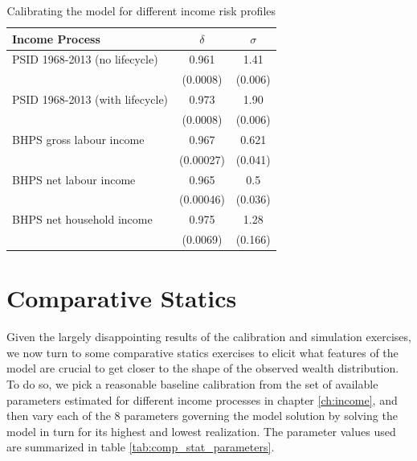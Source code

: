 \begin{table}%
\begin{tabular}{|l|c|c|}
\hline
       Income Process            & $\delta$ & $\sigma$ \\
\hline                          
PSID 1968-2013 (no lifecycle)    &  0.961 & 1.41    \\
                  & \footnotesize{(0.0008)} & \footnotesize{(0.006)} \\ 
PSID 1968-2013 (with lifecycle)  &  0.973 & 1.90    \\
                  & \footnotesize{(0.0008)} & \footnotesize{(0.006)} \\
BHPS gross labour income         &  0.967 & 0.621    \\
                  & \footnotesize{(0.00027)} & \footnotesize{(0.041)} \\
BHPS net labour income           &  0.965 & 0.5    \\
                  & \footnotesize{(0.00046)} & \footnotesize{(0.036)} \\
BHPS net household income        &  0.975 & 1.28     \\
                  & \footnotesize{(0.0069)} & \footnotesize{(0.166)} \\
\hline
\end{tabular}
\caption{Calibrating the model for different income risk profiles}
\label{tab:calibration_results}
\end{table} 


\section{Comparative Statics}\label{sec:comp_stats}
Given the largely disappointing results of the calibration and simulation exercises,
we now turn to some comparative statics exercises to elicit what features of the 
model are crucial to get closer to the shape of the observed wealth distribution.
To do so, we pick a reasonable baseline calibration from the set of available 
parameters estimated for different income processes in chapter \ref{ch:income}, 
and then vary each of the 8 parameters governing the model solution by solving 
the model in turn for its highest and lowest realization. The parameter values
used are summarized in table \ref{tab:comp_stat_parameters}. 

